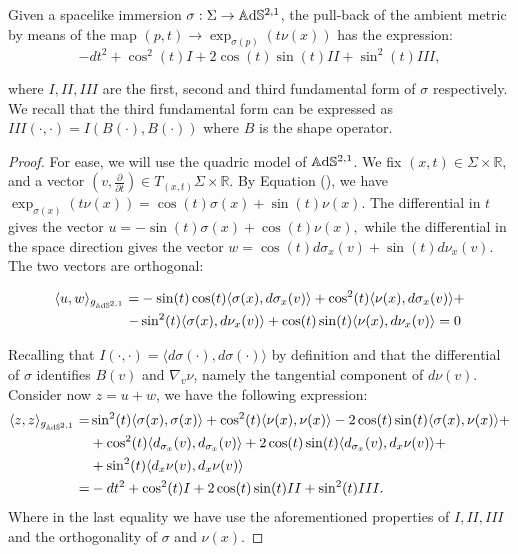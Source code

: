 \begin{lemma}
    Given a spacelike immersion $\sigma:\Sigma\to\mathbb{A}\mathrm{d}\mathbb{S}^{2,1}$, the pull-back of the ambient metric by means of the map $(p,t)\to\exp_{\sigma(p)}(t\nu(x))$ has the expression: 
\begin{equation}\label{64}
    -dt^{2}+\cos^2(t)I+2\cos(t)\sin(t)II+\sin^2(t)III, 
\end{equation}

where $I,II,III$ are the first, second and third fundamental form of $\sigma$ respectively. We recall that the third fundamental form can be expressed as $III(\cdot,\cdot)=I(B(\cdot),B(\cdot))$ where $B$ is the shape operator.
\end{lemma}
\begin{proof}
    For ease, we will use the quadric model of $\mathbb{A}\mathrm{d}\mathbb{S}^{2,1}$. We fix $(x,t)\in\Sigma\times\mathbb{R},$ and a vector $(v,\frac{\partial}{\partial t})\in T_{(x,t)}\Sigma\times\mathbb{R}.$ By Equation (), we have $\exp_{\sigma(x)}(t\nu(x))=\cos(t)\sigma(x)+\sin(t)\nu(x)$. The differential in $t$ gives the vector $u=-\sin(t)\sigma(x)+\cos(t)\nu(x),$ while the differential in the space direction gives the vector $w=\cos(t)d\sigma_x(v)+\sin(t)d\nu_x(v)$. The two vectors are orthogonal: 

    \begin{align*}
          \langle u,w\rangle_{g_{\mathbb{A}\mathrm{d}\mathbb{S}^{2,1}}}=&-\sin(t)\cos(t)\langle \sigma(x),d\sigma_x(v)\rangle+\cos^2(t)\langle\nu(x),d\sigma_x(v)\rangle+\\-&\sin^2(t)\langle \sigma(x),d\nu_x(v)\rangle+\cos(t)\sin(t)\langle \nu(x),d\nu_x(v)\rangle=0
    \end{align*}
      
    
    
    Recalling that $I(\cdot,\cdot)=\langle d\sigma(\cdot),d\sigma(\cdot)\rangle$ by definition and that the differential of $\sigma$ identifies $B(v)$ and $\nabla_v\nu$, namely the tangential component of $d\nu(v)$. Consider now $z=u+w$, we have the following expression:
    \begin{align*}
        \langle z,z\rangle_{g_{\mathbb{A}\mathrm{d}\mathbb{S}^{2,1}}}=&\sin^{2}(t)\langle \sigma(x),\sigma(x)\rangle+\cos^{2}(t)\langle \nu(x),\nu(x)\rangle-2\cos(t)\sin(t)\langle \sigma(x),\nu(x)\rangle+\\&+\cos^2(t)\langle d_{\sigma_x}(v),d_{\sigma_x}(v)\rangle+2\cos(t)\sin(t)\langle d_{\sigma_x}(v),d_x\nu(v)\rangle+\\&+\sin^2(t)\langle d_x\nu(v),d_x\nu(v)\rangle \\
        =&-dt^{2}+\cos^2(t)I+2\cos(t)\sin(t)II+\sin^{2}(t)III. 
    \end{align*}
    Where in the last equality we have use the aforementioned properties of $I,II,III$ and the orthogonality of $\sigma$ and $\nu(x).$
\end{proof}

